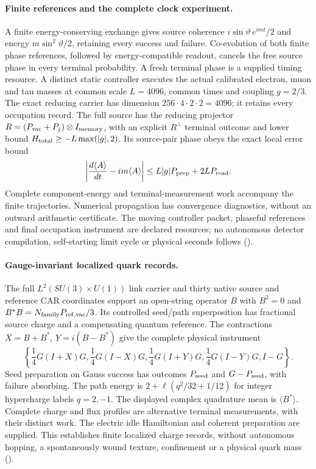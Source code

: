 \paragraph{Finite references and the complete clock experiment.}
A finite energy-conserving exchange gives source coherence
$i\sin\vartheta\,e^{imt}/2$ and energy $m\sin^2\vartheta/2$,
retaining every success and failure. Co-evolution of both finite phase
references, followed by energy-compatible readout, cancels the free source
phase in every terminal probability. A fresh terminal phase is a supplied
timing resource. A distinct static controller executes the actual calibrated
electron, muon and tau masses at common scale $L=4096$, common times and
coupling $g=2/3$. The exact reducing carrier has dimension
$256\cdot4\cdot2\cdot2=4096$; it retains every occupation record.
The full source has the reducing projector
$R=(P_{\rm vac}+P_j)\otimes I_{\rm memory}$, with an explicit $R^\perp$
terminal outcome and lower bound $H_{\rm total}\ge-L\max(|g|,2)$.
Its source-pair phase obeys the exact local error bound
\[
 \left|\frac{d\langle A\rangle}{dt}-im\langle A\rangle\right|
 \le L|g|P_{\rm prep}+2L P_{\rm read}.
\]
Complete component-energy and terminal-measurement work accompany the
finite trajectories. Numerical propagation has convergence diagnostics,
without an outward arithmetic certificate. The moving controller packet,
phaseful references and final occupation instrument are declared resources;
no autonomous detector compilation, self-starting limit cycle or physical
seconds follows ().

\paragraph{Gauge-invariant localized quark records.}
The full $L^2(SU(3)\times U(1))$ link carrier and thirty native source and
reference CAR coordinates support an open-string operator $B$ with
$B^2=0$ and $B^*B=N_{\rm family}P_{\rm ref,vac}/3$.
Its controlled seed/path superposition has fractional source charge and
a compensating quantum reference. The contractions $X=B+B^*$,
$Y=i(B-B^*)$ give the complete physical instrument
\[
 \left\{\frac14G(I+X)G,\frac14G(I-X)G,
 \frac14G(I+Y)G,\frac14G(I-Y)G,I-G\right\}.
\]
Seed preparation on Gauss success has outcomes $P_{\rm seed}$ and
$G-P_{\rm seed}$, with failure absorbing. The path energy is
$2+\ell(q^2/32+1/12)$ for integer hypercharge labels $q=2,-1$.
The displayed complex quadrature mean is $\langle B^*\rangle$.
Complete charge and flux profiles are alternative terminal measurements,
with their distinct work. The electric idle Hamiltonian and coherent
preparation are supplied. This establishes finite localized charge records,
without autonomous hopping, a spontaneously wound texture, confinement
or a physical quark mass ().


